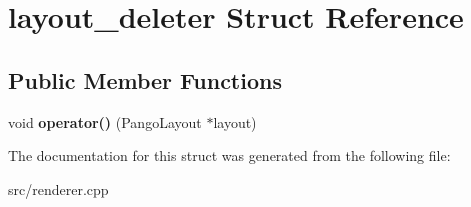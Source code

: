\hypertarget{structlayout__deleter}{}\section{layout\+\_\+deleter Struct Reference}
\label{structlayout__deleter}
\subsection*{Public Member Functions}
\begin{DoxyCompactItemize}
\item 
\mbox{\label{structlayout__deleter_a14a15ea4e333a927ca21053b3f3dc376}} 
void {\bfseries operator()} (Pango\+Layout $\ast$layout)
\end{DoxyCompactItemize}


The documentation for this struct was generated from the following file\+:\begin{DoxyCompactItemize}
\item 
src/renderer.\+cpp\end{DoxyCompactItemize}
